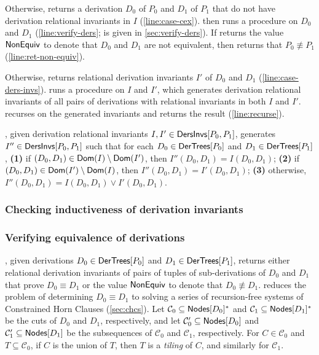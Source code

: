 Otherwise, \chkinductive returns a derivation $D_0$ of $P_0$ and $D_1$
of $P_1$ that do not have derivation relational
invariants in $I$ (\autoref{line:case-cex}).
%
\verifyaux then runs a procedure \verifyders on $D_0$ and $D_1$
(\autoref{line:verify-ders}; \verifyders is given in
\autoref{sec:verify-ders}).
%
If \verifyders returns the value $\mathsf{NonEquiv}$ to denote that $D_0$ and
$D_1$ are not equivalent, then \verifyaux returns that $P_0 \not\equiv
P_1$ (\autoref{line:ret-non-equiv}).

Otherwise, \verifyders returns relational derivation invariants $I'$
of $D_0$ and $D_1$ (\autoref{line:case-ders-invs}).
%
\verifyaux runs a procedure \mergeinvs on $I$ and $I'$, which
generates derivation relational invariants of all pairs of derivations
with relational invariants in both $I$ and $I'$.
%
\verifyaux recurses on the generated invariants and returns the result
(\autoref{line:recurse}).

\mergeinvs, given derivation relational invariants $I, I' \in
\mathsf{DersInvs}[ P_0, P_1 ]$, generates $I'' \in \mathsf{DersInvs}[ P_0, P_1 ]$ such
that for each $D_0 \in \mathsf{DerTrees}[ P_0 ]$ and $D_1 \in \mathsf{DerTrees}[ P_1 ]$, %
\textbf{(1)} if $(D_0, D_1) \in \mathsf{Dom}(I) \setminus \mathsf{Dom}(I')$,
then $I''(D_0, D_1) = I(D_0, D_1)$;
%
\textbf{(2)} if $(D_0, D_1) \in \mathsf{Dom}(I') \setminus \mathsf{Dom}(I)$,
then $I''(D_0, D_1) = I'(D_0, D_1)$; %
\textbf{(3)} otherwise, $I''(D_0, D_1) = I(D_0, D_1) \lor I'(D_0,
D_1)$.

\subsubsection{Checking inductiveness of derivation invariants}
\label{sec:chk-ind}

%

\subsubsection{Verifying equivalence of derivations}
\label{sec:verify-ders}
%
\verifyders, given derivations $D_0 \in \mathsf{DerTrees}[ P_0 ]$ and $D_1 \in
\mathsf{DerTrees}[ P_1 ]$, returns either relational derivation invariants of
pairs of tuples of sub-derivations of $D_0$ and $D_1$ that prove $D_0
\equiv D_1$ or the value $\mathsf{NonEquiv}$ to denote that $D_0 \not\equiv
D_1$.
%
\verifyders reduces the problem of determining $D_0 \equiv D_1$ to
solving a series of recursion-free systems of Constrained Horn Clauses
(\autoref{sec:chcs}).
%
Let $\mathcal{C}_0 \subseteq \mathsf{Nodes}[ D_0 ]^{*}$ and $\mathcal{C}_1
\subseteq \mathsf{Nodes}[ D_1 ]^{*}$ be the cuts of $D_0$ and $D_1$,
respectively, and let $\mathcal{C}_0' \subseteq \mathsf{Nodes}[ D_0 ]$ and
$\mathcal{C}_1' \subseteq \mathsf{Nodes}[ D_1 ]$ be the subsequences of
$\mathcal{C}_0$ and $\mathcal{C}_1$, respectively.
%
For $C \in \mathcal{C}_0$ and $T \subseteq \mathcal{C}_0$, if $C$ is
the union of $T$, then $T$ is a \emph{tiling} of $C$, and similarly
for $\mathcal{C}_1$.

